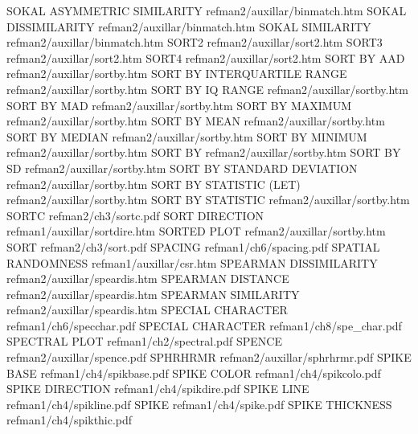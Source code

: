 SOKAL ASYMMETRIC SIMILARITY             refman2/auxillar/binmatch.htm
SOKAL DISSIMILARITY                     refman2/auxillar/binmatch.htm
SOKAL SIMILARITY                        refman2/auxillar/binmatch.htm
SORT2                                   refman2/auxillar/sort2.htm
SORT3                                   refman2/auxillar/sort2.htm
SORT4                                   refman2/auxillar/sort2.htm
SORT BY AAD                             refman2/auxillar/sortby.htm
SORT BY INTERQUARTILE RANGE             refman2/auxillar/sortby.htm
SORT BY IQ RANGE                        refman2/auxillar/sortby.htm
SORT BY MAD                             refman2/auxillar/sortby.htm
SORT BY MAXIMUM                         refman2/auxillar/sortby.htm
SORT BY MEAN                            refman2/auxillar/sortby.htm
SORT BY MEDIAN                          refman2/auxillar/sortby.htm
SORT BY MINIMUM                         refman2/auxillar/sortby.htm
SORT BY                                 refman2/auxillar/sortby.htm
SORT BY SD                              refman2/auxillar/sortby.htm
SORT BY STANDARD DEVIATION              refman2/auxillar/sortby.htm
SORT BY STATISTIC (LET)                 refman2/auxillar/sortby.htm
SORT BY STATISTIC                       refman2/auxillar/sortby.htm
SORTC                                   refman2/ch3/sortc.pdf
SORT DIRECTION                          refman1/auxillar/sortdire.htm
SORTED PLOT                             refman2/auxillar/sortby.htm
SORT                                    refman2/ch3/sort.pdf
SPACING                                 refman1/ch6/spacing.pdf
SPATIAL RANDOMNESS                      refman1/auxillar/csr.htm
SPEARMAN DISSIMILARITY                  refman2/auxillar/speardis.htm
SPEARMAN DISTANCE                       refman2/auxillar/speardis.htm
SPEARMAN SIMILARITY                     refman2/auxillar/speardis.htm
SPECIAL CHARACTER                       refman1/ch6/specchar.pdf
SPECIAL CHARACTER                       refman1/ch8/spe_char.pdf
SPECTRAL PLOT                           refman1/ch2/spectral.pdf
SPENCE                                  refman2/auxillar/spence.pdf
SPHRHRMR                                refman2/auxillar/sphrhrmr.pdf
SPIKE BASE                              refman1/ch4/spikbase.pdf
SPIKE COLOR                             refman1/ch4/spikcolo.pdf
SPIKE DIRECTION                         refman1/ch4/spikdire.pdf
SPIKE LINE                              refman1/ch4/spikline.pdf
SPIKE                                   refman1/ch4/spike.pdf
SPIKE THICKNESS                         refman1/ch4/spikthic.pdf
